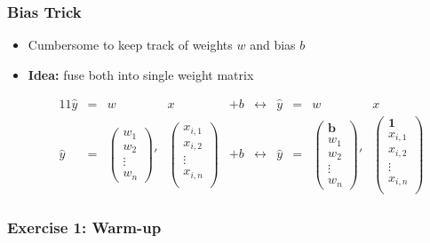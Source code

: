 \documentclass[aspectratio=169]{beamer}
\begin{document}
\begin{frame}
\frametitle{Bias Trick}

\begin{itemize}
\item Cumbersome to keep track of weights $w$ and bias $b$
\item \textbf{Idea:} fuse both into single weight matrix

\begin{alignat*}{11}
\hat{y}&=&w&x&+b&\leftrightarrow&\hat{y}&=&w&x \\
\hat{y}&=&\begin{pmatrix}
w_{1} \\
w_{2} \\
\vdots \\
w_{n}
\end{pmatrix}'&
\begin{pmatrix}
x_{i,1}\\
x_{i,2}\\
\vdots\\
x_{i,n}\\
\end{pmatrix}&+b&\leftrightarrow&\hat{y}&=&
\begin{pmatrix}
\textbf{b} \\
w_{1} \\
w_{2} \\
\vdots \\
w_{n}
\end{pmatrix}'&
\begin{pmatrix}
\textbf{1}\\
x_{i,1}\\
x_{i,2}\\
\vdots\\
x_{i,n}\\
\end{pmatrix}
\end{alignat*}
\end{itemize}
\end{frame}

\begin{frame}
\frametitle{Exercise 1: Warm-up}

\begin{figure}
    \centering
\end{figure}

\end{frame}
\end{document}
